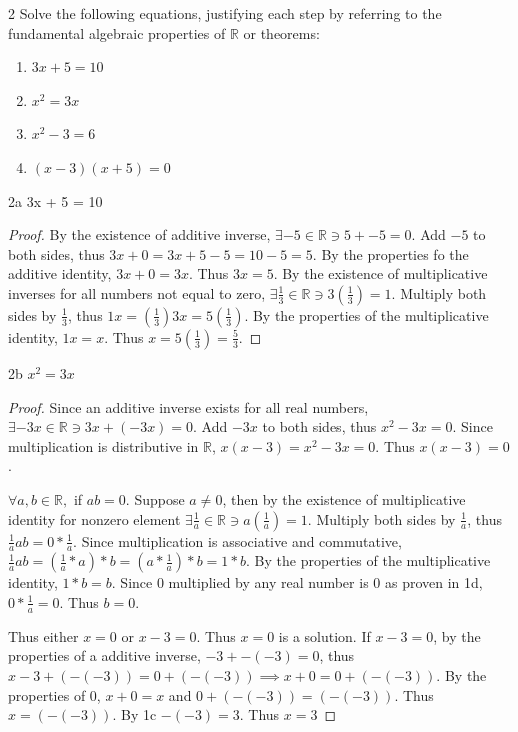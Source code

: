 \documentclass{article}
\newcommand{\R}{\mathbb{R}}
\begin{document}
\bigskip
\begin{PROB}{2}\label{Problem 2.}
    Solve the following equations, justifying each step by referring to the fundamental algebraic properties of $\R$ or theorems:

    \begin{enumerate}
        \item $3x + 5 = 10$
        \item $x^2 = 3x$
        \item $x^2 - 3 = 6$
        \item $(x - 3)(x + 5) = 0$    
    \end{enumerate}
\end{PROB}
\begin{PROB}{2a}\label{Problem 2a.}
    3x + 5 = 10
\end{PROB}
\begin{proof}
    By the existence of additive inverse, $\exists -5 \in \R \ni 5 + -5 = 0$. Add $-5$ to both sides, thus $3x + 0 = 3x + 5 - 5 = 10 - 5 = 5$. By the properties fo the additive identity, $3x + 0 = 3x$. Thus $3x = 5$. By the existence of multiplicative inverses for all numbers not equal to zero, $\exists \frac{1}{3} \in \R \ni 3(\frac{1}{3}) = 1$. Multiply both sides by $\frac{1}{3}$, thus $1x = (\frac{1}{3})3x = 5(\frac{1}{3})$. By the properties of the multiplicative identity, $1x =x$. Thus $x = 5(\frac{1}{3}) = \frac{5}{3}$.      
\end{proof}
\begin{PROB}{2b}\label{Problem 2b.}
    $x^2 = 3x$ 
\end{PROB}
\begin{proof}
    Since an additive inverse exists for all real numbers, $\exists -3x \in \R \ni 3x + (-3x) = 0$. Add $-3x$ to both sides, thus $x^2 - 3x = 0$. Since multiplication is distributive in $\R$, $x(x-3) = x^2 - 3x = 0$. Thus $x(x-3) = 0$. 
    
    $\forall a,b \in \R,$ if $ab = 0$. Suppose $a \neq 0$, then by the existence of multiplicative identity for nonzero element $\exists \frac{1}{a} \in \R \ni a(\frac{1}{a}) = 1$. Multiply both sides by $\frac{1}{a}$, thus $\frac{1}{a}ab = 0 * \frac{1}{a}$. Since multiplication is associative and commutative, $\frac{1}{a}ab = (\frac{1}{a} * a) * b = (a * \frac{1}{a})*b = 1*b$. By the properties of the multiplicative identity, $1*b  = b$. Since 0 multiplied by any real number is 0 as proven in 1d, $0 * \frac{1}{a} = 0$. Thus $b = 0$.         
    
    Thus either $x = 0$ or $x - 3 = 0$. Thus $x = 0 $ is a solution. If $x - 3 = 0$, by the properties of a additive inverse, $-3 + -(-3) = 0$, thus $x - 3 +(-(-3)) =  0 + (-(-3)) \implies x + 0 =0 + (-(-3))$. By the properties of 0, $x + 0 = x$ and $0 + (-(-3)) = (-(-3))$. Thus $x = (-(-3))$. By 1c $-(-3) = 3$. Thus $x = 3$                      
\end{proof}
\end{document}
